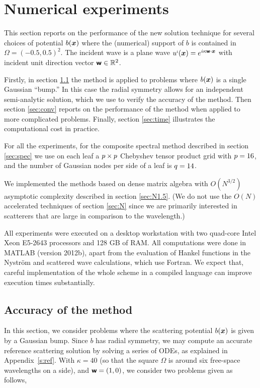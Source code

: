\documentclass[11pt,final]{amsart}
\theoremstyle{definition}
\numberwithin{remark}{section}
\numberwithin{definition}{section}
\numberwithin{pro}{section}
\begin{document}
\section{Numerical experiments}
\label{sec:numerics}
This section reports on the performance of the new solution technique
for several choices of potential $b(\bm{x})$ where the (numerical) support of $b$ is contained
in $\Omega = (-0.5,0.5)^2$.  The incident wave is
a plane wave $u^{\mbox{\tiny i}}(\bm{x}) = e^{i\kappa \bm{\mathsf{w}}\cdot\bm{x}}$ with incident unit direction vector $\bm{\mathsf{w}}\in\mathbb{R}^2$.

Firstly, in section \ref{sec:acc} the method is applied to
problems where $b(\bm{x})$ is a single Gaussian ``bump.''
In this case the radial symmetry
allows for an independent semi-analytic solution,
which we use to verify the accuracy of the method.
Then section \ref{sec:conv} reports on the performance of the method when
applied to more complicated problems.  Finally, section \ref{sec:time}
illustrates the computational cost in practice.

For all the experiments, for the composite spectral method described in section \ref{sec:spec}
we use on each leaf a $p\times p$ Chebyshev tensor product grid with $p=16$,
and the number of Gaussian nodes per side of a leaf is $q=14$.

We implemented the methods based on dense matrix algebra with $O(N^{3/2})$ asymptotic
complexity described in section \ref{sec:N1.5}. (We do not use the $O(N)$ accelerated
techniques of section \ref{sec:N} since we are primarily interested in scatterers that
are large in comparison to the wavelength.)

All experiments were executed on a desktop
workstation with two quad-core Intel Xeon E5-2643 processors and 128 GB
of RAM. All computations were done in MATLAB (version 2012b),
apart from the evaluation of Hankel functions in the Nystr\"om and scattered wave calculations,
which use Fortran.
We expect that, careful implementation of the whole scheme in a compiled language can improve
execution times substantially.

\subsection{Accuracy of the method}
\label{sec:acc}
In this section, we consider problems where the scattering potential $b(\bm{x})$ is given by a Gaussian bump.
Since $b$ has radial symmetry, we may compute an accurate reference
scattering solution by solving a series of ODEs, as explained in
Appendix~\ref{s:ref}.
With $\kappa = 40$ (so that the square $\Omega$ is around six free-space wavelengths on a side),
and $\bm{\mathsf{w}}  = (1,0)$, we consider two problems given as follows,
\end{document}
